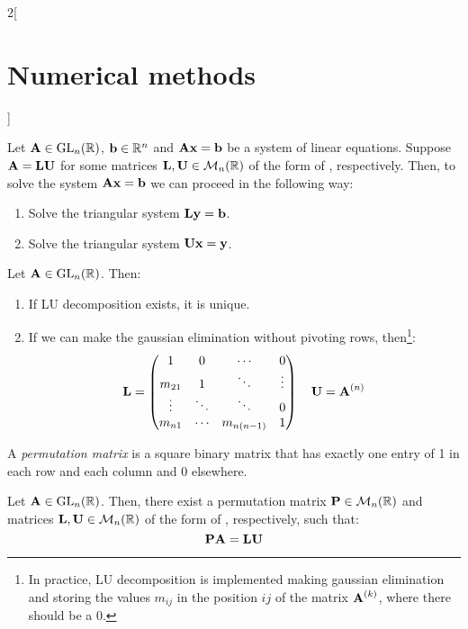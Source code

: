 \documentclass[../../../main_math.tex]{subfiles}
\begin{document}
\begin{multicols}{2}[\section{Numerical methods}]
  \begin{lemma}
    Let $\boldsymbol{\mathrm{A}}\in\mathrm{GL}_n(\mathbb{R})$, $\boldsymbol{\mathrm{b}}\in\mathbb{R}^n$ and $\boldsymbol{\mathrm{A}}\boldsymbol{\mathrm{x}}=\boldsymbol{\mathrm{b}}$ be a system of linear equations. Suppose $\boldsymbol{\mathrm{A}}=\boldsymbol{\mathrm{L}}\boldsymbol{\mathrm{U}}$ for some matrices $\boldsymbol{\mathrm{L}},\boldsymbol{\mathrm{U}}\in\mathcal{M}_n(\mathbb{R})$ of the form of , respectively. Then, to solve the system $\boldsymbol{\mathrm{A}}\boldsymbol{\mathrm{x}}=\boldsymbol{\mathrm{b}}$ we can proceed in the following way:
    \begin{enumerate}
      \item Solve the triangular system $\boldsymbol{\mathrm{L}}\boldsymbol{\mathrm{y}}=\boldsymbol{\mathrm{b}}$.
      \item Solve the triangular system $\boldsymbol{\mathrm{U}}\boldsymbol{\mathrm{x}}=\boldsymbol{\mathrm{y}}$.
    \end{enumerate}
  \end{lemma}
  \begin{proposition}
    Let $\boldsymbol{\mathrm{A}}\in\mathrm{GL}_n(\mathbb{R})$. Then:
    \begin{enumerate}
      \item If LU decomposition exists, it is unique.
      \item If we can make the gaussian elimination without pivoting rows, then\footnote{In practice, LU decomposition is implemented making gaussian elimination and storing the values $m_{ij}$ in the position $ij$ of the matrix $\boldsymbol{\mathrm{A}}^{(k)}$, where there should be a 0.}:
            $$
              \boldsymbol{\mathrm{L}}=
              \begin{pmatrix}
                1      & 0      & \cdots     & 0      \\
                m_{21} & 1      & \ddots     & \vdots \\
                \vdots & \ddots & \ddots     & 0      \\
                m_{n1} & \cdots & m_{n(n-1)} & 1
              \end{pmatrix}\quad
              \boldsymbol{\mathrm{U}}=\boldsymbol{\mathrm{A}}^{(n)}
            $$
    \end{enumerate}
  \end{proposition}
  \begin{definition}
    A \emph{permutation matrix} is a square binary matrix that has exactly one entry of 1 in each row and each column and 0 elsewhere.
  \end{definition}
  \begin{proposition}
    Let $\boldsymbol{\mathrm{A}}\in\mathrm{GL}_n(\mathbb{R})$. Then, there exist a permutation matrix $\boldsymbol{\mathrm{P}}\in\mathcal{M}_n(\mathbb{R})$ and matrices $\boldsymbol{\mathrm{L}},\boldsymbol{\mathrm{U}}\in\mathcal{M}_n(\mathbb{R})$ of the form of , respectively, such that: $$\boldsymbol{\mathrm{P}}\boldsymbol{\mathrm{A}}=\boldsymbol{\mathrm{L}}\boldsymbol{\mathrm{U}}$$
  \end{proposition}

\end{multicols}
\end{document}
